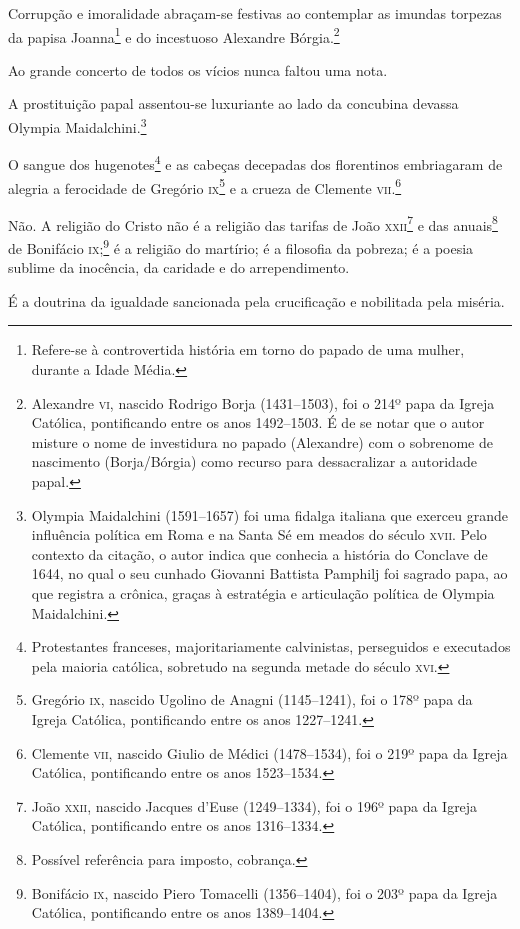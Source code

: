 Corrupção e imoralidade abraçam-se festivas ao contemplar as imundas
torpezas da papisa Joanna\footnote{Refere-se à controvertida história
  em torno do papado de uma mulher, durante a Idade Média.} e do
incestuoso Alexandre Bórgia.\footnote{Alexandre \textsc{vi}, nascido Rodrigo
  Borja (1431--1503), foi o 214º papa da Igreja Católica, pontificando
  entre os anos 1492--1503. É de se notar que o autor misture o nome de
  investidura no papado (Alexandre) com o sobrenome de nascimento
  (Borja/Bórgia) como recurso para dessacralizar a autoridade papal.}

Ao grande concerto de todos os vícios nunca faltou uma nota.

A prostituição papal assentou-se luxuriante ao lado da concubina devassa
Olympia Maidalchini.\footnote{Olympia Maidalchini (1591--1657) foi uma
  fidalga italiana que exerceu grande influência política em Roma e na
  Santa Sé em meados do século \textsc{xvii}. Pelo contexto da citação, o autor
  indica que conhecia a história do Conclave de 1644, no qual o seu
  cunhado Giovanni Battista Pamphilj foi sagrado papa, ao que registra a
  crônica, graças à estratégia e articulação política de Olympia
  Maidalchini.}

O sangue dos hugenotes\footnote{Protestantes franceses,
  majoritariamente calvinistas, perseguidos e executados pela maioria
  católica, sobretudo na segunda metade do século \textsc{xvi}.} e as cabeças
decepadas dos florentinos embriagaram de alegria a ferocidade de
Gregório \textsc{ix}\footnote{Gregório \textsc{ix}, nascido Ugolino de Anagni
  (1145--1241), foi o 178º papa da Igreja Católica, pontificando entre os
  anos 1227--1241.} e a crueza de Clemente \textsc{vii}.\footnote{Clemente \textsc{vii},
  nascido Giulio de Médici (1478--1534), foi o 219º papa da Igreja
  Católica, pontificando entre os anos 1523--1534.}

Não. A religião do Cristo não é a religião das tarifas de João
\textsc{xxii}\footnote{João \textsc{xxii}, nascido Jacques d'Euse (1249--1334), foi o
  196º papa da Igreja Católica, pontificando entre os anos 1316--1334.} e
das anuais\footnote{Possível referência para imposto, cobrança.} de
Bonifácio \textsc{ix};\footnote{Bonifácio \textsc{ix}, nascido Piero Tomacelli
  (1356--1404), foi o 203º papa da Igreja Católica, pontificando entre os
  anos 1389--1404.} é a religião do martírio; é a filosofia da pobreza;
é a poesia sublime da inocência, da caridade e do arrependimento.

É a doutrina da igualdade sancionada pela crucificação e nobilitada pela
miséria.

